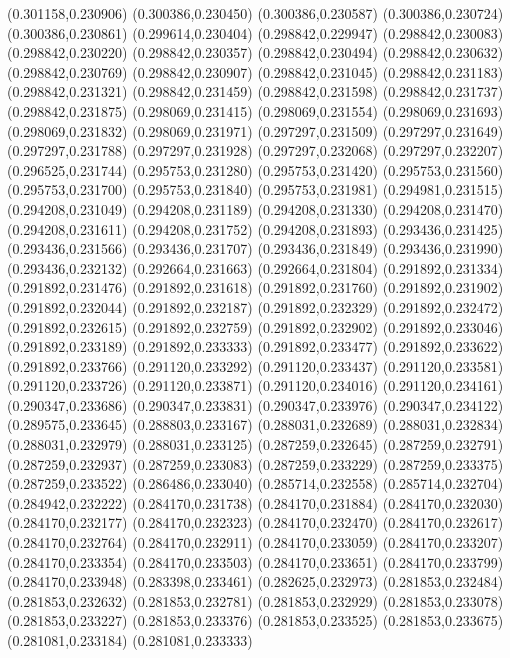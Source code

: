 (0.301158,0.230906)
(0.300386,0.230450)
(0.300386,0.230587)
(0.300386,0.230724)
(0.300386,0.230861)
(0.299614,0.230404)
(0.298842,0.229947)
(0.298842,0.230083)
(0.298842,0.230220)
(0.298842,0.230357)
(0.298842,0.230494)
(0.298842,0.230632)
(0.298842,0.230769)
(0.298842,0.230907)
(0.298842,0.231045)
(0.298842,0.231183)
(0.298842,0.231321)
(0.298842,0.231459)
(0.298842,0.231598)
(0.298842,0.231737)
(0.298842,0.231875)
(0.298069,0.231415)
(0.298069,0.231554)
(0.298069,0.231693)
(0.298069,0.231832)
(0.298069,0.231971)
(0.297297,0.231509)
(0.297297,0.231649)
(0.297297,0.231788)
(0.297297,0.231928)
(0.297297,0.232068)
(0.297297,0.232207)
(0.296525,0.231744)
(0.295753,0.231280)
(0.295753,0.231420)
(0.295753,0.231560)
(0.295753,0.231700)
(0.295753,0.231840)
(0.295753,0.231981)
(0.294981,0.231515)
(0.294208,0.231049)
(0.294208,0.231189)
(0.294208,0.231330)
(0.294208,0.231470)
(0.294208,0.231611)
(0.294208,0.231752)
(0.294208,0.231893)
(0.293436,0.231425)
(0.293436,0.231566)
(0.293436,0.231707)
(0.293436,0.231849)
(0.293436,0.231990)
(0.293436,0.232132)
(0.292664,0.231663)
(0.292664,0.231804)
(0.291892,0.231334)
(0.291892,0.231476)
(0.291892,0.231618)
(0.291892,0.231760)
(0.291892,0.231902)
(0.291892,0.232044)
(0.291892,0.232187)
(0.291892,0.232329)
(0.291892,0.232472)
(0.291892,0.232615)
(0.291892,0.232759)
(0.291892,0.232902)
(0.291892,0.233046)
(0.291892,0.233189)
(0.291892,0.233333)
(0.291892,0.233477)
(0.291892,0.233622)
(0.291892,0.233766)
(0.291120,0.233292)
(0.291120,0.233437)
(0.291120,0.233581)
(0.291120,0.233726)
(0.291120,0.233871)
(0.291120,0.234016)
(0.291120,0.234161)
(0.290347,0.233686)
(0.290347,0.233831)
(0.290347,0.233976)
(0.290347,0.234122)
(0.289575,0.233645)
(0.288803,0.233167)
(0.288031,0.232689)
(0.288031,0.232834)
(0.288031,0.232979)
(0.288031,0.233125)
(0.287259,0.232645)
(0.287259,0.232791)
(0.287259,0.232937)
(0.287259,0.233083)
(0.287259,0.233229)
(0.287259,0.233375)
(0.287259,0.233522)
(0.286486,0.233040)
(0.285714,0.232558)
(0.285714,0.232704)
(0.284942,0.232222)
(0.284170,0.231738)
(0.284170,0.231884)
(0.284170,0.232030)
(0.284170,0.232177)
(0.284170,0.232323)
(0.284170,0.232470)
(0.284170,0.232617)
(0.284170,0.232764)
(0.284170,0.232911)
(0.284170,0.233059)
(0.284170,0.233207)
(0.284170,0.233354)
(0.284170,0.233503)
(0.284170,0.233651)
(0.284170,0.233799)
(0.284170,0.233948)
(0.283398,0.233461)
(0.282625,0.232973)
(0.281853,0.232484)
(0.281853,0.232632)
(0.281853,0.232781)
(0.281853,0.232929)
(0.281853,0.233078)
(0.281853,0.233227)
(0.281853,0.233376)
(0.281853,0.233525)
(0.281853,0.233675)
(0.281081,0.233184)
(0.281081,0.233333)
